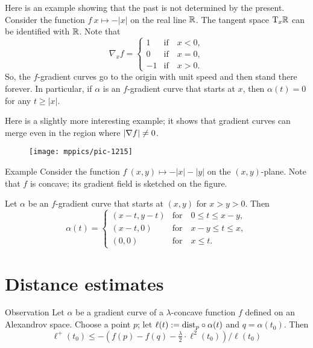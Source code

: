 Here is an example showing that the past is not determined by the present.
Consider the function $f\:x\mapsto -|x|$ on the real line $\mathbb{R}$.
The tangent space $\mathrm{T}_x\mathbb{R}$ can be identified with $\mathbb{R}$.
Note that 
\[\nabla_xf=
\begin{cases}
1&\text{if}\quad x<0,
\\
0&\text{if}\quad x=0,
\\
-1&\text{if}\quad x>0.
\end{cases}
\]
So, the $f$-gradient curves go to the origin with unit speed and then stand there forever.
In particular, if $\alpha$ is an $f$-gradient curve that starts at $x$,
then $\alpha(t)=0$ for any $t\ge |x|$.

Here is a slightly more interesting example;
it shows that gradient curves can merge even in the region where $|\nabla f|\ne 0$. 


\begin{wrapfigure}[8]{r}{34 mm}
\vskip-0mm
\centering
\texttt{[image: mppics/pic-1215]}
\vskip0mm
\end{wrapfigure}

\begin{thm}{Example}
Consider the function $f\:(x,y)\mapsto-|x|-|y|$ on the $(x,y)$-plane.
Note that $f$ is concave;
its gradient field is sketched on the figure.

Let $\alpha$ be an $f$-gradient curve that starts at $(x,y)$ for $x>y>0$.
Then 
\[\alpha(t)=
\begin{cases}
(x-t,y-t) &\text{for}\quad 0\le t\le  x-y,
\\
(x-t,0) &\text{for}\quad x-y\le t\le  x,
\\
(0,0) &\text{for}\quad x\le t.
\end{cases}
\]

\end{thm}


\section{Distance estimates}

\begin{thm}{Observation}\label{eq:fist-var-inq+}
Let $\alpha$ be a gradient curve of a $\lambda$-concave function $f$ 
defined on an Alexandrov space.
Choose a point $p$; let $\ell(t)\mathrel{:=}\mathrm{dist}_p\circ\alpha(t)$ and $q=\alpha(t_0)$.
Then 
\[
\ell^+(t_0)\le -\left({f(p)}-{f(q)}-\tfrac\lambda2\cdot\ell^2(t_0)\right)/\ell(t_0)
\]
\end{thm}

